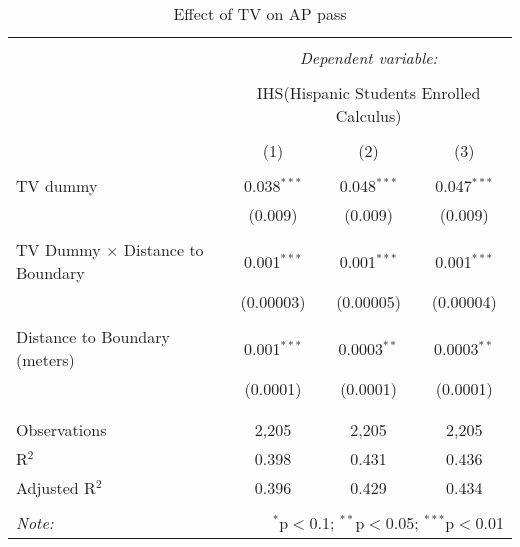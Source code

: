 
\begin{table}[!htbp] \centering 
  \caption{Effect of TV on AP pass} 
  \label{} 
\begin{tabular}{@{\extracolsep{-2pt}}lccc} 
\\[-1.8ex]\hline 
\hline \\[-1.8ex] 
 & \multicolumn{3}{c}{\textit{Dependent variable:}} \\ 
\cline{2-4} 
\\[-1.8ex] & \multicolumn{3}{c}{IHS(Hispanic Students Enrolled Calculus)} \\ 
\\[-1.8ex] & (1) & (2) & (3)\\ 
\hline \\[-1.8ex] 
 TV dummy & 0.038$^{***}$ & 0.048$^{***}$ & 0.047$^{***}$ \\ 
  & (0.009) & (0.009) & (0.009) \\ 
  & & & \\ 
 TV Dummy $\times$ Distance to Boundary & 0.001$^{***}$ & 0.001$^{***}$ & 0.001$^{***}$ \\ 
  & (0.00003) & (0.00005) & (0.00004) \\ 
  & & & \\ 
 Distance to Boundary (meters) & 0.001$^{***}$ & 0.0003$^{**}$ & 0.0003$^{**}$ \\ 
  & (0.0001) & (0.0001) & (0.0001) \\ 
  & & & \\ 
\hline \\[-1.8ex] 
Observations & 2,205 & 2,205 & 2,205 \\ 
R$^{2}$ & 0.398 & 0.431 & 0.436 \\ 
Adjusted R$^{2}$ & 0.396 & 0.429 & 0.434 \\ 
\hline 
\hline \\[-1.8ex] 
\textit{Note:}  & \multicolumn{3}{r}{$^{*}$p$<$0.1; $^{**}$p$<$0.05; $^{***}$p$<$0.01} \\ 
\end{tabular} 
\end{table} 
